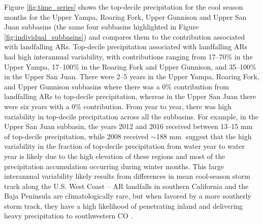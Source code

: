 \documentclass[draft]{agujournal2019}
\begin{document}
Figure \ref{fig:time_series} shows the top-decile precipitation for the cool season months for the Upper Yampa, Roaring Fork, Upper Gunnison and Upper San Juan subbasins (the same four subbasins highlighted in Figure \ref{fig:individual_subbasins}) and compares them to the contribution associated with landfalling ARs. Top-decile precipitation associated with landfalling ARs had high interannual variability, with contributions ranging from 17--70\% in the Upper Yampa, 17--100\% in the Roaring Fork and Upper Gunnison, and 35--100\% in the Upper San Juan. There were 2--5 years in the Upper Yampa, Roaring Fork, and Upper Gunnison subbasins where there was a 0\% contribution from landfalling ARs to top-decile precipitation, whereas in the Upper San Juan there were six years with a 0\% contribution. From year to year, there was high variability in top-decile precipitation across all the subbasins. For example, in the Upper San Juan subbasin, the years 2012 and 2016 received between 13--15 mm of top-decile precipitation, while 2008 received $\sim$188 mm.  suggest that the high variability in the fraction of top-decile precipitation from water year to water year is likely due to the high elevation of these regions and most of the precipitation accumulation occurring during winter months. This large interannual variability likely results from differences in mean cool-season storm track along the U.S. West Coast – AR landfalls in southern California and the Baja Peninsula are climatologically rare, but when favored by a more southerly storm track, they have a high likelihood of penetrating inland and delivering heavy precipitation to southwestern CO \cite{Rutz2014, Rutz2015}.
\end{document}
